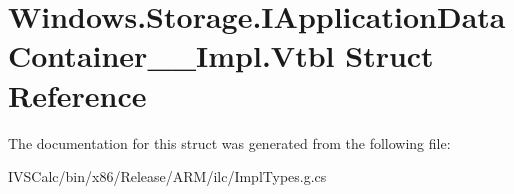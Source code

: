 \hypertarget{struct_windows_1_1_storage_1_1_i_application_data_container_____impl_1_1_vtbl}{}\section{Windows.\+Storage.\+I\+Application\+Data\+Container\+\_\+\+\_\+\+Impl.\+Vtbl Struct Reference}
\label{struct_windows_1_1_storage_1_1_i_application_data_container_____impl_1_1_vtbl}


The documentation for this struct was generated from the following file\+:\begin{DoxyCompactItemize}
\item 
I\+V\+S\+Calc/bin/x86/\+Release/\+A\+R\+M/ilc/Impl\+Types.\+g.\+cs\end{DoxyCompactItemize}
